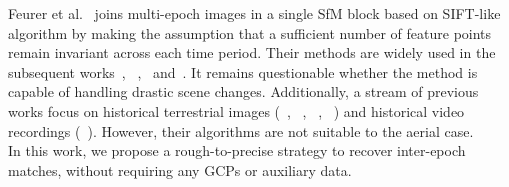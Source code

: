 Feurer et al.~\cite{feurer2018joining} joins multi-epoch images in a single \ac{SfM} block based on SIFT-like algorithm by making the assumption that a sufficient number of feature points remain invariant across each time period. Their methods are widely used in the subsequent works~\cite{filhol2019time}, ~\cite{cook2019simple},~\cite{parente2021automated} and~\cite{blanch2021multi}. It remains questionable whether the method is capable of handling drastic scene changes.
{Additionally, a stream of previous works focus on historical terrestrial images (~\cite{maiwald2021automatic}, ~\cite{beltrami20193d}, ~\cite{bevilacqua2019reconstruction}, ~\cite{maiwald2019generation}) and historical video recordings (~\cite{maiwald2019generation}). However, their algorithms are not suitable to the aerial case.}\\
In this work, we propose a rough-to-precise strategy to recover inter-epoch matches, without requiring any \ac{GCP}s or auxiliary data.
